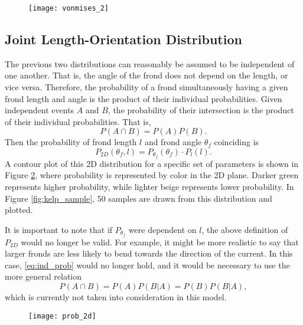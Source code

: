 \begin{figure}[h]
	\centering
	\texttt{[image: vonmises\_2]}
	\label{fig:vonmises}
\end{figure}

\subsection{Joint Length-Orientation Distribution}
\label{sec:dist_2d}
The previous two distributions can reasonably be assumed to be independent of one another. That is, the angle of the frond does not depend on the length, or vice versa.
Therefore, the probability of a frond simultaneously having a given frond length and angle is the product of their individual probabilities.
Given independent events $A$ and $B$, the probability of their intersection is the product of their individual probabilities.
That is,
\begin{equation*}
	\label{eq:ind_prob}
	P(A \cap B) = P(A)P(B).
\end{equation*}
Then the probability of frond length $l$ and frond angle $\theta_f$ coinciding is 
\begin{equation*}
	P_{2D}(\theta_f,l) = P_{\theta_f}(\theta_f) \cdot P_l(l).
\end{equation*}
A contour plot of this 2D distribution for a specific set of parameters is shown in Figure \ref{fig:dist_2d}, where probability is represented by color in the 2D plane.
Darker green represents higher probability, while lighter beige represents lower probability.
In Figure \ref{fig:kelp_sample}, 50 samples are drawn from this distribution and plotted.

It is important to note that if $P_{\theta_f}$ were dependent on $l$, the above definition of $P_{2D}$ would no longer be valid.
For example, it might be more realistic to say that larger fronds are less likely to bend towards the direction of the current.
In this case, \eqref{eq:ind_prob} would no longer hold, and it would be necessary to use the more general relation
\begin{equation*}
	P(A \cap B) = P(A)P(B|A) = P(B)P(B|A),
\end{equation*}
which is currently not taken into consideration in this model.

\begin{figure}[h]
	\centering
	\texttt{[image: prob\_2d]}
	\label{fig:dist_2d}
\end{figure}

